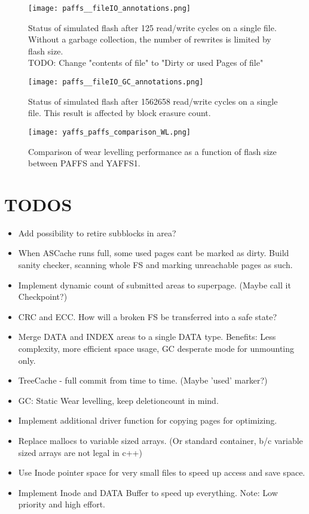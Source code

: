 \begin{figure}[htp]
	\centering\texttt{[image: paffs\_\_fileIO\_annotations.png]}
	\caption{\label{fig:fileIO} Status of simulated flash after 125 read/write cycles on a single file. Without a garbage collection, the number of rewrites is limited by flash size.\\TODO: Change "contents of file" to "Dirty or used Pages of file"}
\end{figure}
\begin{figure}[htp]
	\centering\texttt{[image: paffs\_\_fileIO\_GC\_annotations.png]}
	\caption{\label{fig:fileIO} Status of simulated flash after 1562658 read/write cycles on a single file. This result is affected by block erasure count.}
\end{figure}
\begin{figure}[htp]
	\centering\texttt{[image: yaffs\_paffs\_comparison\_WL.png]}
	\caption{\label{fig:fileIOCompare} Comparison of wear levelling performance as a function of flash size between PAFFS and YAFFS1.}
\end{figure}


\appendix
\section{TODOS}
\begin{itemize}
    \item Add possibility to retire subblocks in area?
	\item When ASCache runs full, some used pages cant be marked as dirty. Build sanity checker, scanning whole FS and marking unreachable pages as such.
	\item Implement dynamic count of submitted areas to superpage. (Maybe call it Checkpoint?)
	\item CRC and ECC. How will a broken FS be transferred into a safe state?
	\item Merge DATA and INDEX areas to a single DATA type. Benefits: Less complexity, more efficient space usage, GC desperate mode for unmounting only.
	\item TreeCache - full commit from time to time. (Maybe 'used' marker?)
	\item GC: Static Wear levelling, keep deletioncount in mind.
	\item Implement additional driver function for copying pages for optimizing.
	\item Replace mallocs to variable sized arrays. (Or standard container, b/c variable sized arrays are not legal in c++)
	\item Use Inode pointer space for very small files to speed up access and save space.
	\item Implement Inode and DATA Buffer to speed up everything. Note: Low priority and high effort.
\end{itemize}
